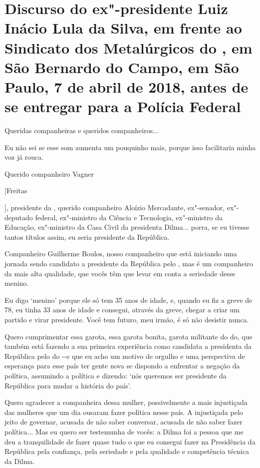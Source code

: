 \chapter*{Discurso do ex"-presidente Luiz Inácio Lula da Silva, em frente ao
Sindicato dos Metalúrgicos do , em São Bernardo do Campo, em São
Paulo, 7 de abril de 2018, antes de se entregar para a Polícia Federal}


Queridas companheiras e queridos companheiros...

Eu não sei se esse som aumenta um pouquinho mais, porque isso
facilitaria minha voz já rouca.

Querido companheiro Vagner {[Freitas{], presidente da ,
querido companheiro Aloízio Mercadante, ex"-senador, ex"-deputado federal,
ex"-ministro da Ciência e Tecnologia, ex"-ministro da Educação,
ex"-ministro da Casa Civil da presidenta Dilma... porra, se eu tivesse
tantos títulos assim, eu seria presidente da República.

Companheiro Guilherme Boulos, nosso companheiro que está iniciando
uma jornada sendo candidato a presidente da República pelo , mas é
um companheiro da mais alta qualidade, que vocês têm que levar em conta
a seriedade desse menino.

Eu digo `menino' porque ele só tem 35 anos de idade, e, quando eu
fiz a greve de 78, eu tinha 33 anos de idade e consegui, através da
greve, chegar a criar um partido e virar presidente. Você tem futuro,
meu irmão, é só não desistir nunca.

Quero cumprimentar essa garota, essa garota bonita, garota
militante do do, que também está fazendo a sua primeira experiência
como candidata a presidenta da República pelo do -\/-e que eu acho
um motivo de orgulho e uma perspectiva de esperança para esse país ter
gente nova se dispondo a enfrentar a negação da política, assumindo a
política e dizendo: `nós queremos ser presidente da República para mudar
a história do país'.

Quero agradecer a companheira dessa mulher, possivelmente a mais
injustiçada das mulheres que um dia ousaram fazer política nesse país. A
injustiçada pelo jeito de governar, acusada de não saber conversar,
acusada de não saber fazer política... Mas eu quero ser testemunha de
vocês: a Dilma foi a pessoa que me deu a tranquilidade de fazer quase
tudo o que eu consegui fazer na Presidência da República pela confiança,
pela seriedade e pela qualidade e competência técnica da Dilma.

}}
